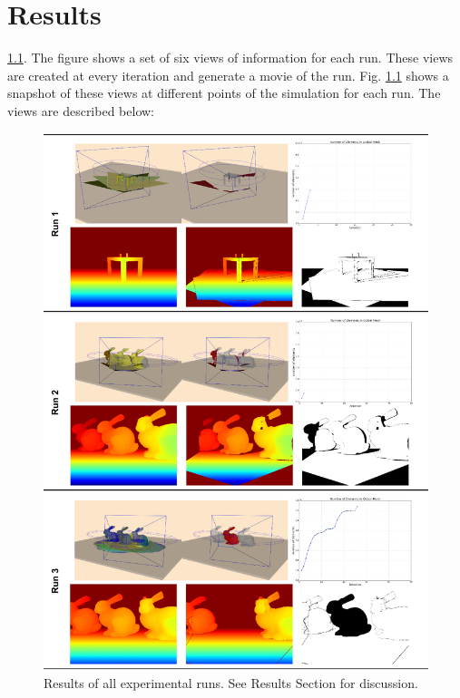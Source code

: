 \chapter{Results} \label{chapter:results}

\ref{fig:run123}. The figure shows a set of six views of information for each
run. These views are created at every iteration and generate a movie of the run.
Fig. \ref{fig:run123} shows a snapshot of these views at different points of the
simulation for each run. The views are described below:

\begin{figure}[h]%
\centering
  \includegraphics[width=\textwidth]{figures/run123.png}
  \caption{Results of all experimental runs. See Results Section for discussion.}
  \label{fig:run123}
\end{figure}


